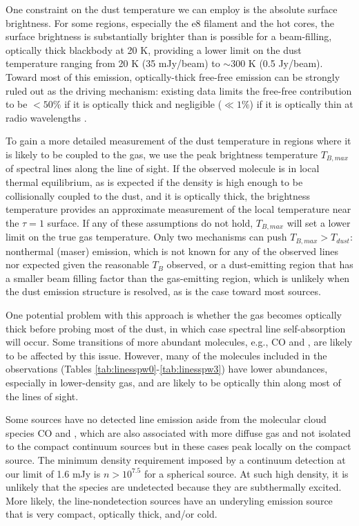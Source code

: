 \documentclass{emulateapj}
\begin{document}
One constraint on the dust temperature we can employ is the absolute surface
brightness.  For some regions, especially the e8 filament and the hot cores,
the surface brightness is substantially
brighter than is possible for a beam-filling, optically thick blackbody at 20
K, providing a lower limit on the dust temperature ranging from 20 K (35
mJy/beam) to $\sim300$ K (0.5 Jy/beam).  Toward most of this emission, optically-thick
free-free emission can be strongly ruled out as the driving mechanism: 
existing data limits the free-free contribution to be $<50\%$ if it is
optically thick and negligible ($\ll1\%$) if it is optically thin at radio
wavelengths \citep{Ginsburg2016b, Goddi2016a}.

To gain a more detailed measurement of the dust temperature in regions where it
is likely to be coupled to the gas, we use the peak brightness temperature
$T_{B,max}$ of spectral lines along the line of sight.  If the observed
molecule is in local thermal equilibrium, as is expected if the density is high
enough to be collisionally coupled to the dust, and it is optically thick, the
brightness temperature provides an approximate measurement of the local
temperature near the $\tau=1$ surface.  If any of these assumptions do not
hold, $T_{B,max}$ will set a lower limit on the true gas temperature.  Only 
two mechanisms can push $T_{B,max} > T_{dust}$: nonthermal (maser) emission, which
is not known for any of the observed lines nor expected given the reasonable
$T_B$ observed, or a dust-emitting region that has a smaller beam filling
factor than the gas-emitting region, which is unlikely when the dust emission
structure is resolved, as is the case toward most sources.

One potential problem with this approach is whether the gas becomes optically thick
before probing most of the dust, in which case spectral line self-absorption
will occur.  Some transitions of more abundant molecules, e.g., CO and
\formaldehyde, are likely to be affected by this issue.  However, many of the
molecules included in the observations (Tables
\ref{tab:linesspw0}-\ref{tab:linesspw3}) have lower abundances, especially in
lower-density gas, and are likely to be optically thin along most of the lines
of sight.

Some sources have no detected line emission aside from the molecular cloud
species CO and \formaldehyde, which are also associated with more diffuse gas
and not isolated to the compact continuum sources but in these cases peak
locally on the compact source.  The minimum density requirement imposed by a
continuum detection at our limit of 1.6 mJy is $n>10^{7.5}$ \percc for a
spherical source.  At such high density, it is unlikely that the species are
undetected because they are subthermally excited.  More likely, the
line-nondetection sources have an underyling emission source that is very
compact, optically thick, and/or cold.
\end{document}
